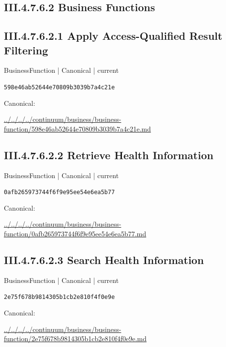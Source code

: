 \documentclass[10pt,a4paper]{article}
\begin{document}
\subsection*{III.4.7.6.2 Business Functions}
\subsection*{III.4.7.6.2.1 Apply Access-Qualified Result Filtering}
\label{element-598e46ab52644e70809b3039b7a4c21e}
{\small BusinessFunction | Canonical | current}\par
\texttt{598e46ab52644e70809b3039b7a4c21e}\par
Canonical: \par
{\footnotesize\url{../../../../continuum/business/business-function/598e46ab52644e70809b3039b7a4c21e.md}}\par
\subsection*{III.4.7.6.2.2 Retrieve Health Information}
\label{element-0afb265973744f6f9e95ee54e6ea5b77}
{\small BusinessFunction | Canonical | current}\par
\texttt{0afb265973744f6f9e95ee54e6ea5b77}\par
Canonical: \par
{\footnotesize\url{../../../../continuum/business/business-function/0afb265973744f6f9e95ee54e6ea5b77.md}}\par
\subsection*{III.4.7.6.2.3 Search Health Information}
\label{element-2e75f678b9814305b1cb2e810f4f0e9e}
{\small BusinessFunction | Canonical | current}\par
\texttt{2e75f678b9814305b1cb2e810f4f0e9e}\par
Canonical: \par
{\footnotesize\url{../../../../continuum/business/business-function/2e75f678b9814305b1cb2e810f4f0e9e.md}}\par
\end{document}
